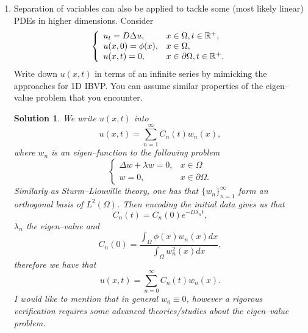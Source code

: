 \documentclass[6pt]{article}
\newtheorem{solution}{Solution}
\numberwithin{equation}{section}
\def\mathbb{\Bbb}
\begin{document}
\begin{enumerate}
\item  Separation of variables can also be applied to tackle some (most likely linear) PDEs in higher dimensions.  Consider
\begin{equation}
\left\{
\begin{array}{ll}
u_t=D\Delta u,& x\in\Omega,t\in\mathbb R^+,\\
u(x,0)=\phi(x),&x\in\Omega,\\
u(x,t)=0, &x\in\partial \Omega, t\in\mathbb R^+.
\end{array}
\right.
\end{equation}
Write down $u(x,t)$ in terms of an infinite series by mimicking the approaches for 1D IBVP.  You can assume similar properties of the eigen--value problem that you encounter.
\begin{solution}
We write $u(x,t)$ into
\[u(x,t)=\sum_{n=1}^\infty C_n(t)w_n(x),\]
where $w_n$ is an eigen--function to the following problem
\begin{equation}\label{MDEP}
\left\{
\begin{array}{ll}
\Delta w+\lambda w=0,& x\in\Omega\\
w=0, &x\in\partial \Omega.
\end{array}
\right.
\end{equation}
Similarly as Sturm--Liouville theory, one has that $\{w_n\}_{n=1}^\infty$ form an orthogonal basis of $L^2(\Omega)$.  Then encoding the initial data gives us that
\[C_n(t)=C_n(0)e^{-D\lambda_n t},\]
$\lambda_n$ the eigen--value and
\[C_n(0)=\frac{\int_\Omega \phi(x)w_n(x)dx}{\int_\Omega w^2_n(x)dx},\]
therefore we have that
\[u(x,t)=\sum_{n=0}^\infty C_n(t)w_n(x).\]  I would like to mention that in general $w_0\equiv 0$, however a rigorous verification requires some advanced theories/studies about the eigen--value problem.
\end{solution}


\end{enumerate}
\end{document}
